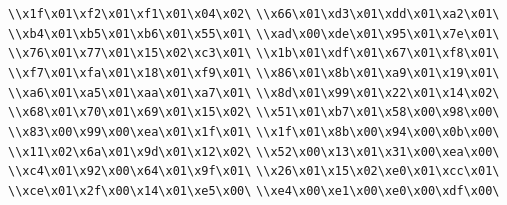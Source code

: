 \verb|\\x1f\x01\xf2\x01\xf1\x01\x04\x02\|\newline
\verb|\\x66\x01\xd3\x01\xdd\x01\xa2\x01\|\newline
\verb|\\xb4\x01\xb5\x01\xb6\x01\x55\x01\|\newline
\verb|\\xad\x00\xde\x01\x95\x01\x7e\x01\|\newline
\verb|\\x76\x01\x77\x01\x15\x02\xc3\x01\|\newline
\verb|\\x1b\x01\xdf\x01\x67\x01\xf8\x01\|\newline
\verb|\\xf7\x01\xfa\x01\x18\x01\xf9\x01\|\newline
\verb|\\x86\x01\x8b\x01\xa9\x01\x19\x01\|\newline
\verb|\\xa6\x01\xa5\x01\xaa\x01\xa7\x01\|\newline
\verb|\\x8d\x01\x99\x01\x22\x01\x14\x02\|\newline
\verb|\\x68\x01\x70\x01\x69\x01\x15\x02\|\newline
\verb|\\x51\x01\xb7\x01\x58\x00\x98\x00\|\newline
\verb|\\x83\x00\x99\x00\xea\x01\x1f\x01\|\newline
\verb|\\x1f\x01\x8b\x00\x94\x00\x0b\x00\|\newline
\verb|\\x11\x02\x6a\x01\x9d\x01\x12\x02\|\newline
\verb|\\x52\x00\x13\x01\x31\x00\xea\x00\|\newline
\verb|\\xc4\x01\x92\x00\x64\x01\x9f\x01\|\newline
\verb|\\x26\x01\x15\x02\xe0\x01\xcc\x01\|\newline
\verb|\\xce\x01\x2f\x00\x14\x01\xe5\x00\|\newline
\verb|\\xe4\x00\xe1\x00\xe0\x00\xdf\x00\|\newline
